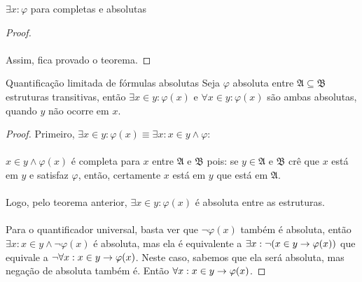 \begin{theorem}{$\exists x:\varphi$ para completas e absolutas}
\begin{proof}
                    \paragraph{}
                        Assim, fica provado o teorema.\eop
                \end{proof}
            \end{theorem}
            \begin{theorem}{Quantificação limitada de fórmulas absolutas}
                Seja $\varphi$ absoluta entre $\mathfrak{A}\subseteq\mathfrak{B}$ estruturas transitivas, então $\exists x\in y: \varphi(x)$ e $\forall x\in y: \varphi(x)$
                são ambas absolutas, quando $y$ não ocorre em $x$.
                \begin{proof}
                    Primeiro, $\exists x\in y: \varphi(x) \equiv \exists x:x\in y\land \varphi$:
                    \begin{prooftree}
                    \end{prooftree}
                    \paragraph{}
                        $x\in y\land\varphi(x)$ é completa para $x$ entre $\mathfrak{A}$ e $\mathfrak{B}$ pois:
                        se $y\in\mathfrak{A}$ e $\mathfrak{B}$ crê que $x$ está em $y$ e satisfaz $\varphi$, 
                        então, certamente $x$ está em $y$ que está em $\mathfrak{A}$.
                    \paragraph{}
                        Logo, pelo teorema anterior, $\exists x\in y: \varphi(x)$ é absoluta entre as estruturas.
                    \paragraph{}
                        Para o quantificador universal, basta ver que $\neg\varphi(x)$ também é absoluta, então 
                        $\exists x: x\in y\land \neg \varphi(x)$ é absoluta, mas ela é equivalente a $\exists x:
                        \neg(x\in y \rar \varphi(x))$ que equivale a $\neg\forall x: x\in y\rar\varphi(x)$. 
                        Neste caso, sabemos que ela será absoluta, mas negação de absoluta também é. Então 
                        $\forall x: x\in y\rar\varphi(x)$.\eop
                \end{proof}
            \end{theorem}
